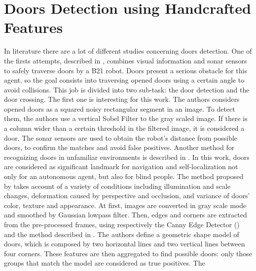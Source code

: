  \section{Doors Detection using Handcrafted Features}
  In literature there are a lot of different studies concerning doors detection. One of the firsts attempts, described in \cite{sonarandivisualdoordetection}, combines visual information and sonar sensors to safely traverse doors by a B21 robot. Doors present a serious obstacle for this agent, so the goal consists into traversing opened doors using a certain angle to avoid collisions. This job is divided into two sub-task: the door detection and the door crossing. The first one is interesting for this work. The authors considers opened doors as a squared noisy
 rectangular segment in an image. To detect them, the authors use a vertical Sobel Filter to the gray scaled image. If there is a column wider than a certain threshold in the filtered image, it is considered a door. The sonar sensors are used to obtain the robot's distance from possible doors, to confirm the matches and avoid false positives. Another method for recognizing doors in unfamiliar environments is described in \cite{edgeandcornerdoorsdetector}. In this work, doors are considered as significant landmark for navigation and self-localization not only for an autonomous agent, but also for blind people. The method proposed by \citeauthor{edgeandcornerdoorsdetector} takes account of a variety of conditions including illumination
 and scale changes, deformation caused by perspective and
 occlusion, and variance of doors’ color, texture and
 appearance. At first, images are converted in gray scale mode and smoothed by Gaussian lowpass filter. Then, edges and corners are extracted from the pre-processed frames, using respectively the Canny Edge Detector (\cite{canny}) and the method described in \cite{cornerdetector}. The authors define a geometric shape
 model of doors, which is composed by two horizontal lines
 and two vertical lines between four corners. These features are then aggregated to find possible doors: only those groups that match the model are considered as true positives. The 
 
